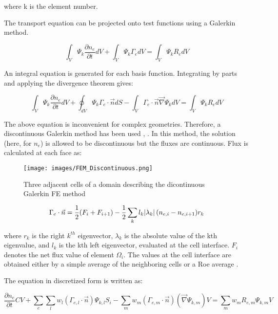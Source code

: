 \documentclass[paper=a4, fontsize=13pt]{scrartcl}
\begin{document}
where k is the element number.

The transport equation can be projected onto test functions using a Galerkin method.

\begin{equation}
\int_{V} \Psi_k \frac{\partial n_e}{\partial t} dV + \int_{V} \Psi_k \Gamma_e dV = \int_{V} \Psi_k R_e dV
\end{equation}

An integral equation is generated for each basis function. Integrating by parts and applying the divergence theorem gives:

\begin{equation}
\int_{V} \Psi_k \frac{\partial n_e}{\partial t} dV + \oint_{dV} \Psi_k \Gamma_e \cdot \vec{n} dS - \int_{V} \Gamma_e \cdot \vec{n} \vec{\nabla} \Psi_k dV  = \int_{V} \Psi_k R_e dV
\end{equation}

The above equation is inconvenient for complex geometries. Therefore, a discontinuous Galerkin method has been used \cite{Shumlak2013High-orderModeling}, \cite{Loverich2011AEquations}. In this method, the solution (here, for $n_e$) is allowed to be discontinuous but the fluxes are continuous. Flux is calculated at each face as:

\begin{figure}
\centering
\texttt{[image: images/FEM\_Discontinuous.png]}
 \caption{Three adjacent cells of a domain describing the dicontinuous Galerkin FE method  \cite{Shumlak2013High-orderModeling} }
  \label{fig:FEM}
\end{figure}

\begin{equation}
\Gamma_e \cdot \vec{n} = \frac{1}{2} (F_{i}+F_{i+1}) - \frac{1}{2} \sum_{k} l_k \abs{\lambda_k}(n_{e,i} - n_{e,i+1}) r_k
\end{equation}

where $r_k$ is the right $k^{th}$ eigenvector, $\lambda_k$ is the absolute value of the kth eigenvalue, and $l_k$ is the kth left eigenvector, evaluated at the cell interface. $F_i$ denotes the net flux value of element $\Omega_i$. The values at the cell interface are obtained either by a simple average of the neighboring cells or a Roe average \cite{Roe1981ApproximateSchemes}.

The equation in discretized form is written as:

\begin{equation}
 \frac{\partial n_e}{\partial t} CV + \sum_{e} \sum_{l} w_l (\Gamma_{e,l} \cdot \vec{n}) \Psi_{k,l} S_i-  \sum_m w_m (\Gamma_{e,m} \cdot \vec{n}) (\vec{\nabla} \Psi_{k,m}) V  = \sum_m w_m R_{e,m} \Psi_{k,m} V
\end{equation}
\end{document}
